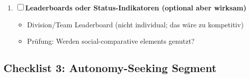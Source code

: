 \begin{tcolorbox}[colback=blue!5!white, colframe=blue!75!black, title=\textbf{Deployment Checklist: Social-Oriented}]
\begin{enumerate}[label=\textbf{SO-\arabic*}]
\item ☐ \textbf{Leaderboards oder Status-Indikatoren (optional aber wirksam)}
  \begin{itemize}[nosep]
  \item Division/Team Leaderboard (nicht individual; das wäre zu kompetitiv)
  \item Prüfung: Werden social-comparative elements genutzt?
  \end{itemize}
\end{enumerate}

\end{tcolorbox}

\subsection{Checklist 3: Autonomy-Seeking Segment}


